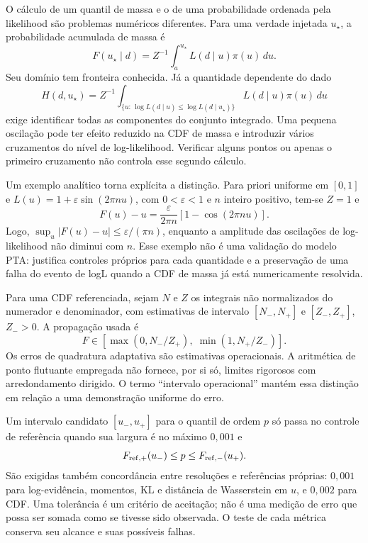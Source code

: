 O cálculo de um quantil de massa e o de uma probabilidade ordenada pela
likelihood são problemas numéricos diferentes. Para uma verdade injetada
\(u_\star\), a probabilidade acumulada de massa é
\begin{equation}
 F(u_\star\mid d)=Z^{-1}\int_a^{u_\star}L(d\mid u)\pi(u)\,du.
 \label{eq:c09-pit-massa}
\end{equation}
Seu domínio tem fronteira conhecida. Já a quantidade dependente do dado
\begin{equation}
 H(d,u_\star)=Z^{-1}\int_{\{u:\,\log L(d\mid u)\leq
                  \log L(d\mid u_\star)\}}
                  L(d\mid u)\pi(u)\,du
 \label{eq:c09-pit-logl}
\end{equation}
exige identificar todas as componentes do conjunto integrado. Uma pequena
oscilação pode ter efeito reduzido na CDF de massa e introduzir vários
cruzamentos do nível de log-likelihood. Verificar alguns pontos ou apenas
o primeiro cruzamento não controla esse segundo cálculo.

Um exemplo analítico torna explícita a distinção. Para priori uniforme em
\([0,1]\) e \(L(u)=1+\varepsilon\sin(2\pi n u)\), com
\(0<\varepsilon<1\) e \(n\) inteiro positivo, tem-se \(Z=1\) e
\begin{equation}
 F(u)-u=\frac{\varepsilon}{2\pi n}
              [1-\cos(2\pi n u)].
 \label{eq:c09-exemplo-oscilatorio}
\end{equation}
Logo, \(\sup_u|F(u)-u|\leq\varepsilon/(\pi n)\), enquanto a amplitude
das oscilações de log-likelihood não diminui com \(n\). Esse exemplo não é
uma validação do modelo PTA: justifica controles próprios para cada
quantidade e a preservação de uma falha do evento de logL quando a CDF de
massa já está numericamente resolvida.

Para uma CDF referenciada, sejam \(N\) e \(Z\) os integrais não normalizados
do numerador e denominador, com estimativas de intervalo
\([N_-,N_+]\) e \([Z_-,Z_+]\), \(Z_->0\). A propagação usada é
\begin{equation}
 F\in\left[\max(0,N_-/Z_+),\;
                  \min(1,N_+/Z_-)\right].
 \label{eq:c09-razao-integral}
\end{equation}
Os erros de quadratura adaptativa são estimativas operacionais. A aritmética
de ponto flutuante empregada não fornece, por si só, limites rigorosos com
arredondamento dirigido. O termo ``intervalo operacional'' mantém essa
distinção em relação a uma demonstração uniforme do erro.

Um intervalo candidato \([u_-,u_+]\) para o quantil de ordem \(p\) só passa
no controle de referência quando sua largura é no máximo \(0,001\) e
\begin{equation}
 F_{\rm ref,+}(u_-)\leq p\leq F_{\rm ref,-}(u_+).
 \label{eq:c09-bracket-quantil}
\end{equation}
São exigidas também concordância entre resoluções e referências próprias:
\(0,001\) para log-evidência, momentos, KL e distância de Wasserstein em
\(u\), e \(0,002\) para CDF. Uma tolerância é um critério de aceitação;
não é uma medição de erro que possa ser somada como se tivesse sido observada.
O teste de cada métrica conserva seu alcance e suas possíveis falhas.


